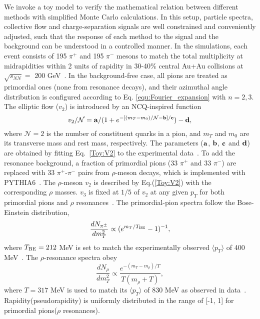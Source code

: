 We invoke a toy model to verify the mathematical relation between different methods with simplified Monte Carlo calculations.
In this setup, particle spectra, collective flow and charge-separation signals are well constrained and  conveniently adjusted, such that the response of each method to the signal and the background can be understood in a controlled manner.  In the simulations, each event consists of 195 $\pi^+$ and 195 $\pi^-$ mesons to match the total multiplicity at midrapidities within 2 units of rapidity in 30-40\% central Au+Au collisions at $\sqrt{s_{NN}}=$ 200 GeV~\cite{STAR-pion-spct}. In the background-free case, all pions are treated as primordial ones (none from resonance decays), and their azimuthal angle distribution is configured according to Eq. \ref {equ:Fourier_expansion} with $n=2,3$. The elliptic flow ($v_2$) is introduced by an NCQ-inspired function~\cite{NCQ-scalling}
\begin{equation} \label{Toy:V2}
v_2/\mathcal{N} = {\bf a}/(1+e^{-[(m_T-m_0)/\mathcal{N} -{\bf b}]/{\bf c}}) - {\bf d}, 
\end{equation}
where $\mathcal{N}=2$ is the number of constituent quarks in a pion, and $m_T$ and $m_0$ are its transverse mass and rest mass, respectively. The parameters (${\bf a}$, ${\bf b}$, ${\bf c}$ and ${\bf d}$) are obtained by fitting Eq.~\ref{Toy:V2} to the experimental data~\cite{Wang:2016iov}. To add the resonance background, a fraction of primordial pions (33 $\pi^+$ and 33 $\pi^-$) are replaced with 33 $\pi^+$-$\pi^-$ pairs from $\rho$-meson decays, which is implemented with PYTHIA6~\cite{PYTHIA}. The $\rho$-meson $v_2$ is described by Eq.(\ref{Toy:V2}) with the corresponding $\rho$ masses. $v_3$ is fixed at $1/5$ of $v_2$ at any given $p_T$ for both primordial pions and $\rho$ resonances~\cite{STAR-rho-spct}.
The primordial-pion spectra  follow the Bose-Einstein distribution,
\begin{equation}
\frac{dN_{\pi^\pm}}{dm_T^2} \propto (e^{m_T/T_{\rm BE}}-1)^{-1},
\end{equation}
where $T_{\rm BE} = 212$ MeV is set to match the experimentally observed $\langle p_T \rangle$ of 400 MeV~\cite{STAR-pion-spct}. The $\rho$-resonance spectra obey 
\begin{equation}
\frac{dN_\rho}{dm_T^2} \propto \frac{e^{-(m_T-m_\rho)/T}}{T(m_\rho+T)},
\end{equation}
where $T = 317$ MeV is used to match its $\langle p_T \rangle$ of 830 MeV as observed in data~\cite{STAR-rho-spct}. Rapidity(pseudorapidity) is uniformly distributed in the range of [-1, 1] for primordial pions($\rho$ resonances). 


